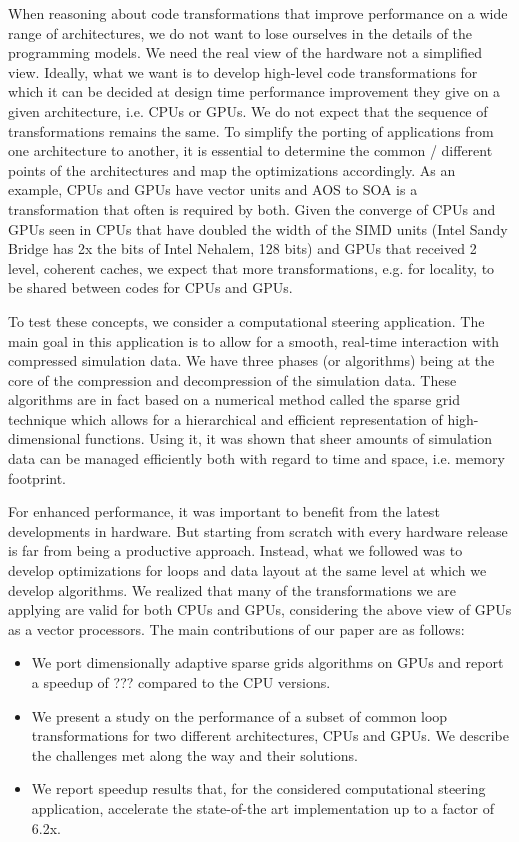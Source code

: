 When reasoning about code transformations that improve performance on a wide
range of architectures, we do not want to lose ourselves in the details of the
programming models. We need the real view of the hardware not a simplified view.
Ideally, what we want is to develop high-level code transformations for which it
can be decided at design time performance improvement they give on a given
architecture, i.e. CPUs or GPUs. We do not expect that the sequence of
transformations remains the same. To simplify the porting of applications from
one architecture to another, it is essential to determine the common / different
points of the architectures and map the optimizations accordingly. As an
example, CPUs and GPUs have vector units and AOS to SOA is a transformation that
often is required by both. Given the converge of CPUs and GPUs seen in CPUs that
have doubled the width of the SIMD units (Intel Sandy Bridge has 2x the bits of
Intel Nehalem, 128 bits) and GPUs that received 2 level, coherent caches, we
expect that more transformations, e.g. for locality, to be shared between codes
for CPUs and GPUs.

To test these concepts, we consider a computational steering application. The
main goal in this application is to allow for a smooth, real-time interaction
with compressed simulation data. We have three phases (or algorithms) being at the
core of the compression and decompression of the simulation data. These
algorithms are in fact based on a numerical method called the sparse grid
technique which allows for a hierarchical and efficient representation of
high-dimensional functions. Using it, it was shown that sheer amounts of
simulation data can be managed efficiently both with regard to time and space,
i.e. memory footprint.

For enhanced performance, it was important to benefit from the latest
developments in hardware. But starting from scratch with every hardware release
is far from being a productive approach. Instead, what we followed was to
develop optimizations for loops and data layout at the same level at which we
develop algorithms. We realized that many of the transformations we are applying
are valid for both CPUs and GPUs, considering the above view of GPUs as a vector
processors. The main contributions of our paper are as follows:

\begin{itemize}
  \item We port dimensionally adaptive sparse grids algorithms on GPUs and
  report a speedup of ??? compared to the CPU versions.
  \item We present a study on the performance of a subset of common loop
  transformations for two different architectures, CPUs and GPUs. We describe
  the challenges met along the way and their solutions.
  \item We report speedup results that, for the considered computational
  steering application, accelerate the state-of-the art implementation up to a
  factor of 6.2x.
\end{itemize}


